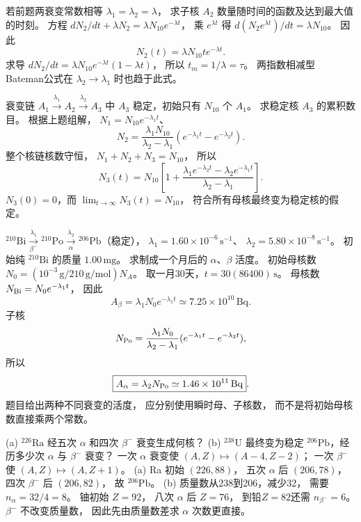 若前题两衰变常数相等
$\lambda_1=\lambda_2=\lambda$，
求子核 $A_2$ 数量随时间的函数及达到最大值的时刻。
\exsolution
方程
$dN_2/dt+\lambda N_2=
\lambda N_{10}e^{-\lambda t}$，
乘 $e^{\lambda t}$ 得
$d(N_2e^{\lambda t})/dt=\lambda N_{10}$。
因此
\[
 \boxed{N_2(t)=\lambda N_{10}t e^{-\lambda t}}.
\]
求导
$dN_2/dt=\lambda N_{10}e^{-\lambda t}(1-\lambda t)$，
所以
$\boxed{t_m=1/\lambda=\tau}$。
\excheck 两指数相减型
Bateman公式在 $\lambda_2\to\lambda_1$
时也趋于此式。

衰变链
$A_1\xrightarrow{\lambda_1}A_2
\xrightarrow{\lambda_2}A_3$
中 $A_3$ 稳定，初始只有 $N_{10}$ 个 $A_1$。
求稳定核 $A_3$ 的累积数目。
\exsolution
根据上题组解，
$N_1=N_{10}e^{-\lambda_1 t}$、
\[
 N_2=\frac{\lambda_1N_{10}}
 {\lambda_2-\lambda_1}
 (e^{-\lambda_1t}-e^{-\lambda_2t}).
\]
整个核链核数守恒，
$N_1+N_2+N_3=N_{10}$，
所以
\[
 \boxed{N_3(t)=N_{10}\left[
 1+\frac{\lambda_1e^{-\lambda_2t}
 -\lambda_2e^{-\lambda_1t}}
 {\lambda_2-\lambda_1}\right]}.
\]
\excheck $N_3(0)=0$，而
$\lim_{t\to\infty}N_3(t)=N_{10}$，
符合所有母核最终变为稳定核的假定。

$\mathrm{^{210}Bi}\xrightarrow[\beta^-]{\lambda_1}
\mathrm{^{210}Po}\xrightarrow[\alpha]{\lambda_2}
\mathrm{^{206}Pb}$（稳定），
$\lambda_1=1.60\times10^{-6}\,\mathrm{s^{-1}}$、
$\lambda_2=5.80\times10^{-8}\,\mathrm{s^{-1}}$。
初始纯 $\mathrm{^{210}Bi}$ 的质量 $1.00\,\mathrm{mg}$。
求制成一个月后的 $\alpha$、$\beta$ 活度。
\exsolution
初始母核数
$N_0=(10^{-3}\,\mathrm g/210\,\mathrm{g/mol})N_A$。
取一月30天，$t=30(86400)\,\mathrm s$。
母核数 $N_{\rm Bi}=N_0e^{-\lambda_1t}$，
因此
\[
 \boxed{A_\beta=\lambda_1N_0e^{-\lambda_1t}
 \simeq7.25\times10^{10}\,\mathrm{Bq}}.
\]
子核
\[
 N_{\rm Po}=
 \frac{\lambda_1N_0}{\lambda_2-\lambda_1}
 (e^{-\lambda_1t}-e^{-\lambda_2t}),
\]
所以
\[
 \boxed{A_\alpha=\lambda_2 N_{\rm Po}
 \simeq1.46\times10^{11}\,\mathrm{Bq}}.
\]
\excheck 题目给出两种不同衰变的活度，
应分别使用瞬时母、子核数，
而不是将初始母核数直接乘两个常数。

(a) $\mathrm{^{226}Ra}$ 经五次 $\alpha$
和四次 $\beta^-$ 衰变生成何核？
(b) $\mathrm{^{238}U}$ 最终变为稳定
$\mathrm{^{206}Pb}$，经历多少次 $\alpha$
与 $\beta^-$ 衰变？
\exsolution
一次 $\alpha$ 衰变使
$(A,Z)\mapsto(A-4,Z-2)$；
一次 $\beta^-$ 使
$(A,Z)\mapsto(A,Z+1)$。
(a) Ra 初始 $(226,88)$，
五次 $\alpha$ 后 $(206,78)$，
四次 $\beta^-$ 后 $(206,82)$，
故 $\boxed{\mathrm{^{206}Pb}}$。
(b) 质量数从238到206，减少32，
需要 $\boxed{n_\alpha=32/4=8}$。
铀初始 $Z=92$，
八次 $\alpha$ 后 $Z=76$，
到铅$Z=82$还需
$\boxed{n_{\beta^-}=6}$。
\excheck $\beta^-$ 不改变质量数，
因此先由质量数差求 $\alpha$ 次数更直接。

